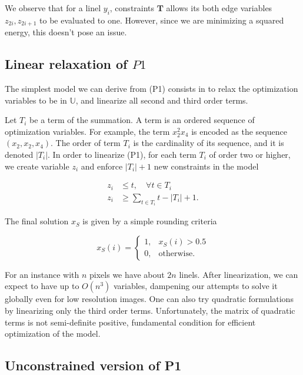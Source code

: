 We observe that for a linel $y_i$, constraints $\mathbf{T}$ allows its both edge variables $z_{2i},z_{2i+1}$ to be evaluated to one. However, since we are minimizing a squared energy, this doesn't pose an issue.




\subsection{Linear relaxation of $P1$}
\label{ch6:subsec:linear-relaxation}

	The simplest model we can derive from (P1) consists in to relax the optimization variables to be in $\mathbb{U}$, and linearize all second and third order terms. 
	
	Let $T_i$ be a term of the summation. A term is an ordered sequence of optimization variables. For example, the term $x_2^2x_4$ is encoded as the sequence $(x_2,x_2,x_4)$. The order of term $T_i$ is the cardinality of its sequence, and it is denoted $|T_i|$. In order to linearize (P1), for each term $T_i$ of order two or higher, we create variable $z_i$ and enforce $|T_i|+1$ new constraints in the model
	
	\begin{align*}
		z_i &\leq t, \quad \forall t \in T_i \\
		z_i &\geq \sum_{t \in T_i}{t} - |T_i| + 1.		
	\end{align*}

	The final solution $x_S$ is given by a simple rounding criteria
	
\[
	x_S(i) = \left\{ \begin{array}{ll}

		 	1,& x_S(i) > 0.5\\
		 	0,& \text{otherwise}.
 	
	\end{array}\right.
\]	

	For an instance with $n$ pixels we have about $2n$ linels. After linearization, we can expect to have up to $O(n^3)$ variables, dampening our attempts to solve it globally even for low resolution images. One can also try quadratic formulations by linearizing only the third order terms. Unfortunately, the matrix of quadratic terms is not semi-definite positive, fundamental condition for efficient optimization of the model.
	


\subsection{Unconstrained version of P1}
\label{ch6:subsec:unconstrained-version}

